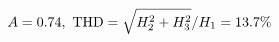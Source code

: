 \documentclass[preview]{standalone}
\begin{document}
\begin{align*}
\special{dvisvgm:raw <g id='unique000'>}A=0.74,\ \text{THD}=\sqrt{H_2^2+H_3^2}/H_1=13.7\%\special{dvisvgm:raw </g>}
\end{align*}
\end{document}
